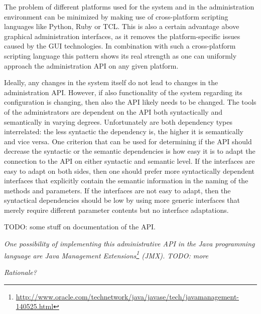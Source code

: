 The problem of different platforms used for the system and in the administration environment can be minimized by making use of cross-platform scripting languages like Python, Ruby or TCL. This is also a certain advantage above graphical administration interfaces, as it removes the platform-specific issues caused by the GUI technologies. In combination with such a cross-platform scripting language this pattern shows its real strength as one can uniformly approach the administration API on any given platform.

Ideally, any changes in the system itself do not lead to changes in the administration API. However, if also functionality of the system regarding its configuration is changing, then also the API likely needs to be changed. The tools of the administrators are dependent on the API both syntactically and semantically in varying degrees. Unfortunately are both dependency types interrelated: the less syntactic the dependency is, the higher it is semantically and vice versa. One criterion that can be used for determining if the API should decrease the syntactic or the semantic dependencies is how easy it is to adapt the connection to the API on either syntactic and semantic level. If the interfaces are easy to adapt on both sides, then one should prefer more syntactically dependent interfaces that explicitly contain the semantic information in the naming of the methods and parameters. If the interfaces are not easy to adapt, then the syntactical dependencies should be low by using more generic interfaces that merely require different parameter contents but no interface adaptations.  

TODO: some stuff on documentation of the API.




\textit{One possibility of implementing this administrative API in the Java programming language are Java Management Extensions\footnote{\url{http://www.oracle.com/technetwork/java/javase/tech/javamanagement-140525.html}} (JMX). TODO: more }

\begin{center}
   
\end{center}

\textit{Rationale?}\\

